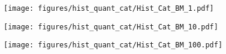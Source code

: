 \begin{multicols}{3}
    \begin{minipage}{\columnwidth}
        \begin{figure}[H]
            \texttt{[image: figures/hist\_quant\_cat/Hist\_Cat\_BM\_1.pdf]}
        \end{figure} 
    \end{minipage}
    
    \begin{minipage}{\columnwidth}
        \begin{figure}[H]
            \texttt{[image: figures/hist\_quant\_cat/Hist\_Cat\_BM\_10.pdf]}
        \end{figure} 
    \end{minipage}
    
    \begin{minipage}{\columnwidth}
        \begin{figure}[H]
            \hspace{0.8cm}\centering
            \texttt{[image: figures/hist\_quant\_cat/Hist\_Cat\_BM\_100.pdf]}
        \end{figure} 
    \end{minipage}
    
\end{multicols}

